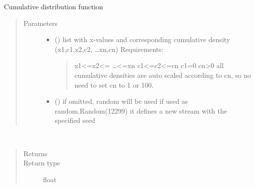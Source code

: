 \documentclass[letterpaper,10pt,english]{sphinxmanual}
\begin{document}

\begin{fulllineitems}
\label{\detokenize{Reference:salabim.Cdf}}
Cumulative distribution function
\begin{quote}\begin{description}
\item[{Parameters}] \leavevmode\begin{itemize}
\item {} 
 () \textendash{} 
list with x-values and corresponding cumulative density
(x1,c1,x2,c2, …xn,cn) 
Requirements:
\begin{quote}

x1\textless{}=x2\textless{}= …\textless{}=xn 
c1\textless{}=c2\textless{}=cn 
c1=0 
cn\textgreater{}0 
all cumulative densities are auto scaled according to cn,
so no need to set cn to 1 or 100.
\end{quote}


\item {} 
 () \textendash{} if omitted, random will be used 
if used as random.Random(12299)
it defines a new stream with the specified seed

\end{itemize}

\end{description}\end{quote}

\begin{fulllineitems}
\label{\detokenize{Reference:salabim.Cdf.mean}}~\begin{quote}\begin{description}
\item[{Returns}] \leavevmode
{}

\item[{Return type}] \leavevmode
float

\end{description}\end{quote}

\end{fulllineitems}


\end{fulllineitems}
\end{document}
